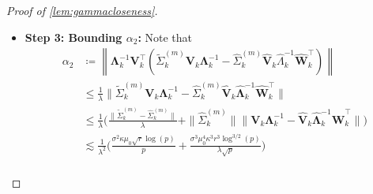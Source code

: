 \documentclass[10pt]{article}
\newcommand{\0}{{\mathbf{0}}}
\newcommand{\1}{{\mathbf{1}}}
\renewcommand{\t}{^{\top}}
\newcommand{\inv}{^{-1}}
\renewcommand{\tilde}{\widetilde}
\renewcommand{\hat}{\widehat}
\renewcommand{\hat}{\widehat}
\begin{document}
\begin{proof}[Proof of \cref{lem:gammacloseness}]
\begin{itemize}
\begin{align}
    &\lesssim \frac{\sigma^2 \log(p)}{\lambda} \bigg(  \frac{\sigma r \sqrt{p} + \kappa^2 \sigma \sqrt{rp\log(p)}}{\lambda^2} \bigg) \label{vhatminusv3} \\
    &\asymp \frac{\sigma^3 r \sqrt{p} \log(p) + \sigma^3 \kappa^2 \sqrt{rp} \log^{3/2}(p)}{\lambda^3} \label{alpha1bound}
\end{align}
where \eqref{sigmahatboundused1} holds by \eqref{sigmahatminussigmatilde} and \eqref{vhatminusv3} follows from \eqref{vhatminusv2}.  This bound holds with probability at least $1 - O(p^{-6})$. 
\item \textbf{Step 3: Bounding $\alpha_2$:} Note that
\begin{align}
    \alpha_2 &\coloneqq \left\|\mathbf{\Lambda}_{k}^{-1} \mathbf{V}_{k}^{\top}\left(\tilde{\Sigma}^{(m)}_k \mathbf{V}_{k} \mathbf{\Lambda}_{k}^{-1}-\hat{\Sigma}^{(m)}_k \hat{\mathbf{V}}_{k} \hat{\Lambda}_{k}^{-1} \hat{\mathbf{W}}_{k}^{\top}\right)\right\| \nonumber \\
    &\leq \frac{1}{\lambda} \bigg\| \tilde \Sigma^{(m)}_k \mathbf{V}_k \mathbf{\Lambda}_k\inv - \hat \Sigma^{(m)}_k \mathbf{\hat V}_k \mathbf{\hat{\Lambda}}_k\inv \mathbf{\hat W}_k\t \bigg\| \nonumber \\
    &\leq \frac{1}{\lambda} \bigg(  \frac{ \| \tilde \Sigma^{(m)}_k - \hat \Sigma^{(m)}_k\|}{\lambda} + \| \hat \Sigma^{(m)}_k \| \| \mathbf{V}_k \mathbf{\Lambda}_k\inv - \mathbf{\hat V}_k \mathbf{\hat{\Lambda}}_k\inv \mathbf{\hat W}_k\t \| \bigg) \nonumber \\
    &\lesssim  \frac{1}{\lambda^2} \bigg( \frac{\sigma^{2} \kappa \mu_{0} \sqrt{r} \log (p)}{p}+\frac{\sigma^{3} \mu_{0}^{4} \kappa^{3} r^{3} \log ^{3 / 2}(p)}{\lambda \sqrt{p}} \bigg) \label{zhatminusz} \\

\end{align}
\end{itemize}
\end{proof}
\end{document}

